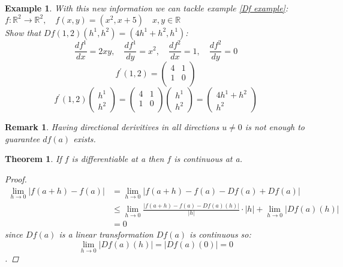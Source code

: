 \documentclass[12pt]{article}
\def\RR{\mathbb{R}}
\newtheorem{theorem}{Theorem}[section]
\newtheorem{example}{Example}[section]
\newtheorem*{remark}{Remark}
\begin{document}
\begin{example} With this new information we can tackle example \ref{Df example}:\\
$f:\RR^{2} \rightarrow \RR^{2}, \quad f(x,y)=(x^{2},x+5) \quad x,y \in \RR$\\
Show that $Df(1,2)(h^{1}, h^{2})=(4h^{1} +  h^{2}, h^{1})$:
\[\frac{df^{1}}{dx} = 2xy, \quad \frac{df^{1}}{dy} = x^{2}, \quad \frac{df^{2}}{dx} = 1, \quad \frac{df^{2}}{dy} = 0\]
\[f^{'}(1,2)=\begin{pmatrix}
 4&1 \\
  1&0 \\
 \end{pmatrix}\]
\[f^{'}(1,2) \left(\!\! \begin{array}{c} h^{1} \\  h^{2} \end{array}\!\! \right)= \begin{pmatrix}
 4&1 \\
  1&0 \\
 \end{pmatrix}\!\!\! \left(\!\! \begin{array}{c} h^{1} \\  h^{2} \end{array}\!\! \right)=  \left(\!\!\! \begin{array}{c} 4h^{1} + h^{2}\\  h^{2} \end{array}\!\! \right)\]
\end{example}

\begin{remark}
Having  directional derivitives in all directions $u\neq 0$ is not enough to guarantee $df(a)$ exists.
\end{remark}

\begin{theorem}
If $f$ is differentiable at a then $f$ is continuous at a.
\begin{proof}
\begin{align*}
\lim_{h \to 0}|f(a+h)-f(a)| &= \lim_{h \to 0}|f(a+h)-f(a) -Df(a) + Df(a)|\\
&\leq \lim_{h \to 0}\frac{|f(a+h)-f(a) -Df(a)(h)|}{|h|}\cdot|h| + \lim_{h \to 0}| Df(a)(h)|\\ 
&= 0 
\end{align*}
since $Df(a)$ is a linear transformation $Df(a)$ is continuous so: \[\lim_{h \to 0}| Df(a)(h)| = | Df(a)(0)| = 0\].
\end{proof}
\end{theorem}
\end{document}
